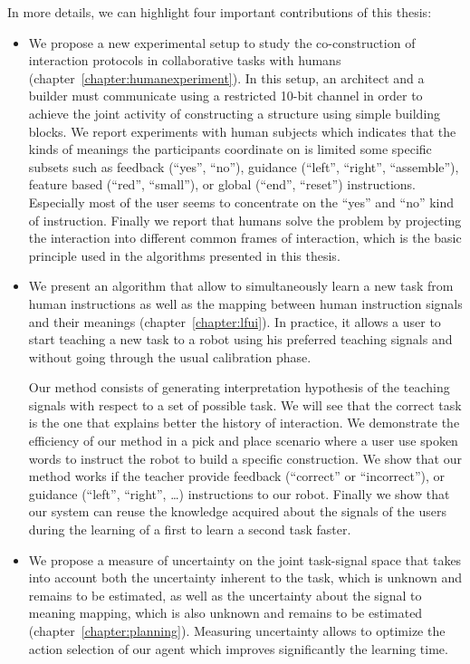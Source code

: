 In more details, we can highlight four important contributions of this thesis:

\begin{itemize}

\item We propose a new experimental setup to study the co-construction of interaction protocols in collaborative tasks with humans \cite{vollmer2014studying} (chapter~\ref{chapter:humanexperiment}). In this setup, an architect and a builder must communicate using a restricted 10-bit channel in order to achieve the joint activity of constructing a structure using simple building blocks. We report experiments with human subjects which indicates that the kinds of meanings the participants coordinate on is limited some specific subsets such as feedback (``yes'', ``no''), guidance (``left'', ``right'', ``assemble''), feature based (``red'', ``small''), or global (``end'', ``reset'') instructions. Especially most of the user seems to concentrate on the ``yes'' and ``no'' kind of instruction. Finally we report that humans solve the problem by projecting the interaction into different common frames of
interaction, which is the basic principle used in the algorithms presented in this thesis.

\item  We present an algorithm that allow to simultaneously learn a new task from human instructions as well as the mapping between human instruction signals and their meanings \cite{grizou2013interactive,grizou2013robot,grizou2014robot,grizou2014calibration,grizou2014interactive} (chapter~\ref{chapter:lfui}). In practice, it allows a user to start teaching a new task to a robot using his preferred teaching signals and without going through the usual calibration phase.  

Our method consists of generating interpretation hypothesis of the teaching signals with respect to a set of possible task. We will see that the correct task is the one that explains better the history of interaction. We demonstrate the efficiency of our method in a pick and place scenario where a user use spoken words to instruct the robot to build a specific construction. We show that our method works if the teacher provide feedback (``correct'' or ``incorrect''), or guidance (``left'', ``right'', \ldots) instructions to our robot. Finally we show that our system can reuse the knowledge acquired about the signals of the users during the learning of a first to learn a second task faster.

\item We propose a measure of uncertainty on the joint task-signal space that takes into account both the uncertainty inherent to the task, which is unknown and remains to be estimated, as well as the uncertainty about the signal to meaning mapping, which is also unknown and remains to be estimated \cite{grizou2014calibration,grizou2014interactive} (chapter~\ref{chapter:planning}). Measuring uncertainty allows to optimize the action selection of our agent which improves significantly the learning time.


\end{itemize}
